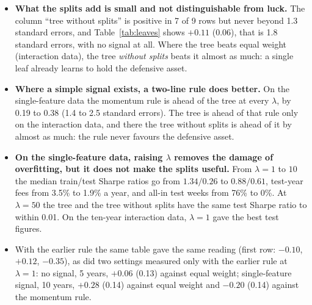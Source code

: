 \documentclass[11pt,a4paper]{article}
\newcommand{\1}{\mathbf{1}}
\begin{document}
\begin{itemize}
\item \textbf{What the splits add is small and not distinguishable from luck.} The column ``tree without splits'' is positive in 7 of 9 rows but never beyond 1.3 standard errors, and Table~\ref{tab:leaves} shows $+0.11$ (0.06), that is 1.8 standard errors, with no signal at all. Where the tree beats equal weight (interaction data), the tree \emph{without splits} beats it almost as much: a single leaf already learns to hold the defensive asset.
\item \textbf{Where a simple signal exists, a two-line rule does better.} On the single-feature data the momentum rule is ahead of the tree at every $\lambda$, by 0.19 to 0.38 (1.4 to 2.5 standard errors). The tree is ahead of that rule only on the interaction data, and there the tree without splits is ahead of it by almost as much: the rule never favours the defensive asset.
\item \textbf{On the single-feature data, raising $\lambda$ removes the damage of overfitting, but it does not make the splits useful.} From $\lambda=1$ to $10$ the median train/test Sharpe ratios go from $1.34/0.26$ to $0.88/0.61$, test-year fees from 3.5\% to 1.9\% a year, and all-in test weeks from 76\% to 0\%. At $\lambda=50$ the tree and the tree without splits have the same test Sharpe ratio to within 0.01. On the ten-year interaction data, $\lambda=1$ gave the best test figures.
\item With the earlier rule the same table gave the same reading (first row: $-0.10$, $+0.12$, $-0.35$), as did two settings measured only with the earlier rule at $\lambda=1$: no signal, 5 years, $+0.06$ (0.13) against equal weight; single-feature signal, 10 years, $+0.28$ (0.14) against equal weight and $-0.20$ (0.14) against the momentum rule.
\end{itemize}
\end{document}
